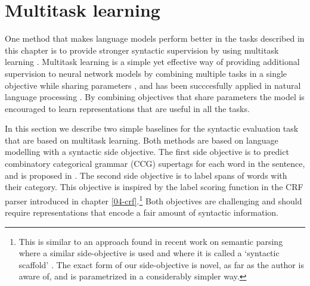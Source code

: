 \section{Multitask learning}
  One method that makes language models perform better in the tasks described in this chapter is to provide stronger syntactic supervision by using multitask learning \citep{enguehard2017multitask,linzen2018targeted}. Multitask learning is a simple yet effective way of providing additional supervision to neural network models by combining multiple tasks in a single objective while sharing parameters \citep{caruana1997multitask}, and has been succcesfully applied in natural language processing \citep{collobert2008unified,collobert2011natural,zhang2016multitask,goldberg2016multitask}. By combining objectives that share parameters the model is encouraged to learn representations that are useful in all the tasks.

  In this section we describe two simple baselines for the syntactic evaluation task that are based on multitask learning. Both methods are based on language modelling with a syntactic side objective. The first side objective is to predict combinatory categorical grammar (CCG) supertags \citep{bangalore1999supertagging} for each word in the sentence, and is proposed in \citep{enguehard2017multitask}. The second side objective is to label spans of words with their category. This objective is inspired by the label scoring function in the CRF parser introduced in chapter \ref{04-crf}.\footnote{This is similar to an approach found in recent work on semantic parsing where a similar side-objective is used and where it is called a `syntactic scaffold' \citep{swayamdipta2018scaffold}. The exact form of our side-objective is novel, as far as the author is aware of, and is parametrized in a considerably simpler way.} Both objectives are challenging and should require representations that encode a fair amount of syntactic information.

